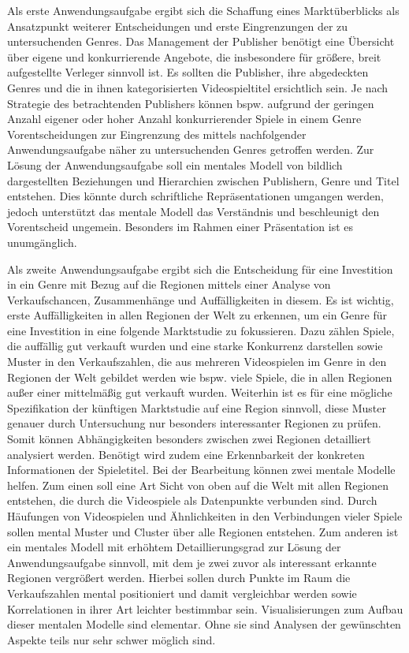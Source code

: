 \documentclass[usegeometry=true]{scrartcl}
\begin{document}
Als erste Anwendungsaufgabe ergibt sich die Schaffung eines Marktüberblicks als Ansatzpunkt weiterer Entscheidungen und erste Eingrenzungen der zu untersuchenden Genres. 
Das Management der Publisher benötigt eine Übersicht über eigene und konkurrierende Angebote, die insbesondere für größere, breit aufgestellte Verleger sinnvoll ist.
Es sollten die Publisher, ihre abgedeckten Genres und die in ihnen kategorisierten Videospieltitel ersichtlich sein. 
Je nach Strategie des betrachtenden Publishers können bspw. aufgrund der geringen Anzahl eigener oder hoher Anzahl konkurrierender Spiele in einem Genre 
Vorentscheidungen zur Eingrenzung des mittels nachfolgender Anwendungsaufgabe näher zu untersuchenden Genres getroffen werden. 
Zur Lösung der Anwendungsaufgabe soll ein mentales Modell von bildlich dargestellten Beziehungen und Hierarchien zwischen Publishern, Genre und Titel entstehen.
Dies könnte durch schriftliche Repräsentationen umgangen werden, jedoch unterstützt das mentale Modell das Verständnis und beschleunigt den Vorentscheid ungemein. 
Besonders im Rahmen einer Präsentation ist es unumgänglich.

Als zweite Anwendungsaufgabe ergibt sich die Entscheidung für eine Investition in ein Genre mit Bezug auf die Regionen mittels einer Analyse von Verkaufschancen, Zusammenhänge und Auffälligkeiten in diesem.
Es ist wichtig, erste Auffälligkeiten in allen Regionen der Welt zu erkennen, um ein Genre für eine Investition in eine folgende Marktstudie zu fokussieren.
Dazu zählen Spiele, die auffällig gut verkauft wurden und eine starke Konkurrenz darstellen sowie Muster in den Verkaufszahlen, 
die aus mehreren Videospielen im Genre in den Regionen der Welt gebildet werden wie bspw. viele Spiele, die in allen Regionen außer einer mittelmäßig gut verkauft wurden.
Weiterhin ist es für eine mögliche Spezifikation der künftigen Marktstudie auf eine Region sinnvoll, diese Muster genauer durch Untersuchung nur besonders interessanter Regionen zu prüfen. 
Somit können Abhängigkeiten besonders zwischen zwei Regionen detailliert analysiert werden. 
Benötigt wird zudem eine Erkennbarkeit der konkreten Informationen der Spieletitel. 
Bei der Bearbeitung können zwei mentale Modelle helfen.
Zum einen soll eine Art Sicht von oben auf die Welt mit allen Regionen entstehen, die durch die Videospiele als Datenpunkte verbunden sind. 
Durch Häufungen von Videospielen und Ähnlichkeiten in den Verbindungen vieler Spiele sollen mental Muster und Cluster über alle Regionen entstehen.
Zum anderen ist ein mentales Modell mit erhöhtem Detaillierungsgrad zur Lösung der Anwendungsaufgabe sinnvoll, mit dem je zwei zuvor als interessant erkannte Regionen vergrößert werden. 
Hierbei sollen durch Punkte im Raum die Verkaufszahlen mental positioniert und damit vergleichbar werden sowie Korrelationen in ihrer Art leichter bestimmbar sein. 
Visualisierungen zum Aufbau dieser mentalen Modelle sind elementar.
Ohne sie sind Analysen der gewünschten Aspekte teils nur sehr schwer möglich sind.
\end{document}
